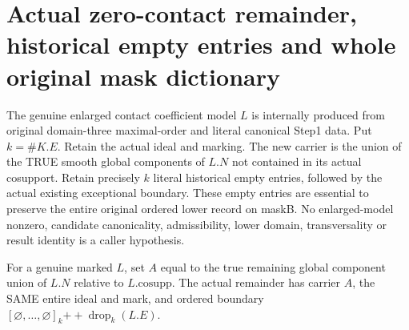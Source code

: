 \section{Actual zero-contact remainder, historical empty entries and whole original mask dictionary}
The genuine enlarged contact coefficient model $L$ is internally produced
from original domain-three maximal-order and literal canonical Step1 data.
Put $k=\#K.E$. Retain the actual ideal and marking. The new carrier is the
union of the TRUE smooth global components of $L.N$ not contained in its
actual cosupport. Retain precisely $k$ literal historical empty entries,
followed by the actual existing exceptional boundary. These empty entries
are essential to preserve the entire original ordered lower record on maskB.
No enlarged-model nonzero, candidate canonicality, admissibility, lower
domain, transversality or result identity is a caller hypothesis.

\begin{definition}
\label{hir:zero-contact-actual-remainder-definition}
\leanok
{}
For a genuine marked $L$, set $A$ equal to the true remaining global component
union of $L.N$ relative to $L.\mathrm{cosupp}$. The actual remainder has
carrier $A$, the SAME entire ideal and mark, and ordered boundary
$[\varnothing,\ldots,\varnothing]_k\mathbin{+\!+}\operatorname{drop}_k(L.E)$.
\end{definition}

